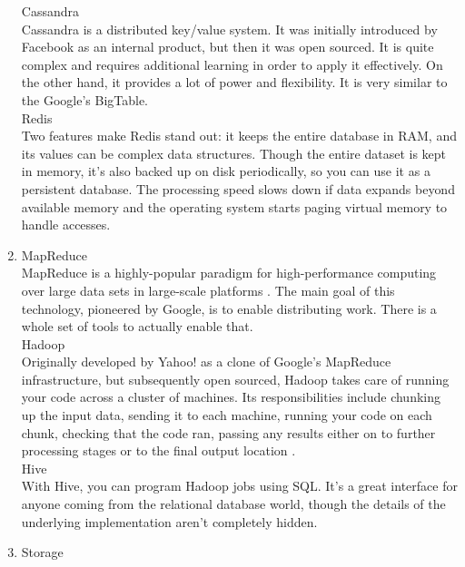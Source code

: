 \documentclass[runningheads]{llncs}
\begin{document}
\begin{enumerate}
Cassandra\\

Cassandra is a distributed key/value system. It was initially introduced by Facebook as an internal product, but then it was open sourced. It is quite complex and requires additional learning in order to apply it effectively. On the other hand, it provides a lot of power and flexibility. It is very similar to the Google's BigTable.\\

Redis\\ 

Two features make Redis stand out: it keeps the entire database in RAM, and its values can be complex data structures. Though the entire dataset is kept in memory, it’s also backed up on disk periodically, so you can use it as a persistent database. The processing speed slows down if data expands beyond available memory and the operating system starts paging virtual memory to handle accesses.\\

\item MapReduce\\

MapReduce is a highly-popular paradigm for high-performance computing over large data sets in large-scale platforms \cite{MAPREDUCE}. The main goal of this technology, pioneered by Google, is to enable distributing work. There is a whole set of tools to actually enable that.\\ 

Hadoop\\

Originally developed by Yahoo! as a clone of Google’s MapReduce infrastructure, but subsequently open sourced, Hadoop takes care of running your code across a cluster of machines. Its responsibilities include chunking up the input data, sending it to each machine, running your code on each chunk, checking that the code ran, passing any
results either on to further processing stages or to the final output location \cite{GLOSSARY}.\\

Hive\\

With Hive, you can program Hadoop jobs using SQL. It’s a great interface for anyone coming from the relational database world, though the details of the underlying implementation aren’t completely hidden.\\

\item Storage\\


\end{enumerate}
\end{document}
